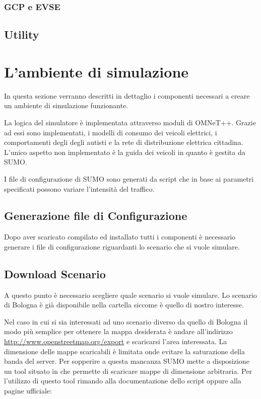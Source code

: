 \subsubsection{GCP e EVSE}

\subsection{Utility}

\section{L'ambiente di simulazione}

In questa sezione verranno descritti in dettaglio i componenti necessari a creare un ambiente di simulazione funzionante.

La logica del simulatore è implementata attraverso moduli di OMNeT++. Grazie ad essi sono implementati, i modelli di consumo dei veicoli elettrici, i comportamenti degli degli autisti e la rete di distribuzione elettrica cittadina. L'unico aspetto non implementato è la guida dei veicoli in quanto è gestita da SUMO.

I file di configurazione di SUMO sono generati da script che in base ai parametri specificati possono variare l'intensità del traffico.


\subsection{Generazione file di Configurazione}

Dopo aver scaricato compilato ed installato tutti i componenti è necessario generare i file di configurazione riguardanti lo scenario che si vuole simulare. 

\subsection{Download Scenario}

A questo punto è necessario scegliere quale scenario si vuole simulare. Lo scenario di Bologna è già disponibile nella cartella  siccome è quello di nostro interesse.

Nel caso in cui si sia interessati ad uno scenario diverso da quello di Bologna il modo più semplice per ottenere la mappa desiderata è andare all'indirizzo \url{http://www.openstreetmap.org/export} e scaricarsi l'area interessata. La dimensione delle mappe scaricabili è limitata onde evitare la saturazione della banda del server. Per sopperire a questa mancanza SUMO mette a disposizione un tool situato in  che permette di scaricare mappe di dimensione arbitraria. Per l'utilizzo di questo tool rimando alla documentazione dello script oppure alla pagine ufficiale:


